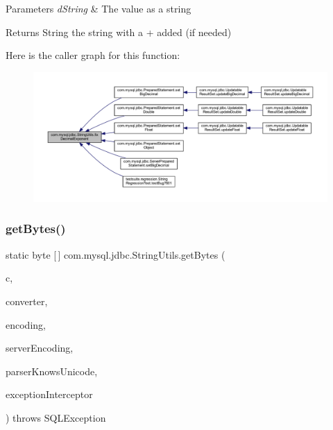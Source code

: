 \begin{DoxyParams}{Parameters}
{\em d\+String} & The value as a string\\
\hline
\end{DoxyParams}
\begin{DoxyReturn}{Returns}
String the string with a \textquotesingle{}+\textquotesingle{} added (if needed) 
\end{DoxyReturn}
Here is the caller graph for this function\+:
\nopagebreak
\begin{figure}[H]
\begin{center}
\leavevmode
\includegraphics[width=350pt]{classcom_1_1mysql_1_1jdbc_1_1_string_utils_afb8f4c9222ba22bd576dfb94ec65f625_icgraph}
\end{center}
\end{figure}
\mbox{\label{classcom_1_1mysql_1_1jdbc_1_1_string_utils_ab237c5e450dc15a76201b3f13d44e6b3}} 
\subsubsection{\texorpdfstring{get\+Bytes()}{getBytes()}\hspace{0.1cm}{\footnotesize\ttfamily [1/7]}}
{\footnotesize\ttfamily static byte \mbox{[}$\,$\mbox{]} com.\+mysql.\+jdbc.\+String\+Utils.\+get\+Bytes (\begin{DoxyParamCaption}\item[{char \mbox{[}$\,$\mbox{]}}]{c,  }\item[{\mbox{\hyperlink{classcom_1_1mysql_1_1jdbc_1_1_single_byte_charset_converter}{Single\+Byte\+Charset\+Converter}}}]{converter,  }\item[{String}]{encoding,  }\item[{String}]{server\+Encoding,  }\item[{boolean}]{parser\+Knows\+Unicode,  }\item[{\mbox{\hyperlink{interfacecom_1_1mysql_1_1jdbc_1_1_exception_interceptor}{Exception\+Interceptor}}}]{exception\+Interceptor }\end{DoxyParamCaption}) throws S\+Q\+L\+Exception\hspace{0.3cm}{\ttfamily [static]}}


